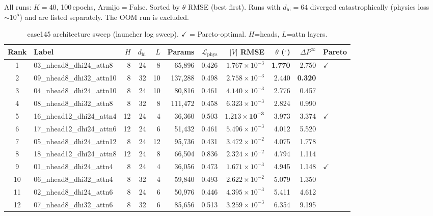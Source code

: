 \documentclass{article}
\begin{document}
All runs: $K=40$, 100\,epochs, Armijo$=\mathrm{False}$.
Sorted by $\theta$ RMSE (best first).
Runs with $d_{\mathrm{hi}}=64$ diverged catastrophically (physics loss
$\sim10^5$) and are listed separately.  The OOM run is excluded.

\begin{table}[h]
\centering
\scriptsize
\caption{case145 architecture sweep (launcher log sweep).
  $\checkmark$ = Pareto-optimal. $H$=heads, $L$=attn layers.}
\label{tab:case145_sweep}
\setlength{\tabcolsep}{3pt}
\begin{tabular}{clrrrrrrrrl}
\toprule
Rank & Label & $H$ & $d_{\mathrm{hi}}$ & $L$ & Params
  & $\mathcal{L}_{\mathrm{phys}}$ & $|V|$ RMSE & $\theta$ (${}^\circ$)
  & $\Delta P^\infty$ & Pareto \\
\midrule
1  & 03\_nhead8\_dhi24\_attn8   & 8 & 24 & 8  & 65,896  & 0.426 & $1.767\times10^{-3}$ & \textbf{1.770} & 2.750 & $\checkmark$ \\
2  & 09\_nhead8\_dhi32\_attn10  & 8 & 32 & 10 & 137,288 & 0.498 & $2.758\times10^{-3}$ & 2.440 & \textbf{0.320} & \\
3  & 04\_nhead8\_dhi24\_attn10  & 8 & 24 & 10 & 80,816  & 0.461 & $4.140\times10^{-3}$ & 2.776 & 0.457 & \\
4  & 08\_nhead8\_dhi32\_attn8   & 8 & 32 & 8  & 111,472 & 0.458 & $6.323\times10^{-3}$ & 2.824 & 0.990 & \\
5  & 16\_nhead12\_dhi24\_attn4  & 12& 24 & 4  & 36,360  & 0.503 & $\mathbf{1.213\times10^{-3}}$ & 3.973 & 3.374 & $\checkmark$ \\
6  & 17\_nhead12\_dhi24\_attn6  & 12& 24 & 6  & 51,432  & 0.461 & $5.496\times10^{-3}$ & 4.012 & 5.520 & \\
7  & 05\_nhead8\_dhi24\_attn12  & 8 & 24 & 12 & 95,736  & 0.431 & $3.472\times10^{-2}$ & 4.075 & 1.778 & \\
8  & 18\_nhead12\_dhi24\_attn8  & 12& 24 & 8  & 66,504  & 0.836 & $2.324\times10^{-2}$ & 4.794 & 1.114 & \\
9  & 01\_nhead8\_dhi24\_attn4   & 8 & 24 & 4  & 36,056  & 0.473 & $1.671\times10^{-3}$ & 4.945 & 1.148 & $\checkmark$ \\
10 & 06\_nhead8\_dhi32\_attn4   & 8 & 32 & 4  & 59,840  & 0.493 & $2.622\times10^{-2}$ & 5.079 & 1.350 & \\
11 & 02\_nhead8\_dhi24\_attn6   & 8 & 24 & 6  & 50,976  & 0.446 & $4.395\times10^{-3}$ & 5.411 & 4.612 & \\
12 & 07\_nhead8\_dhi32\_attn6   & 8 & 32 & 6  & 85,656  & 0.513 & $3.259\times10^{-3}$ & 6.354 & 9.195 & \\

\end{tabular}
\end{table}
\end{document}
